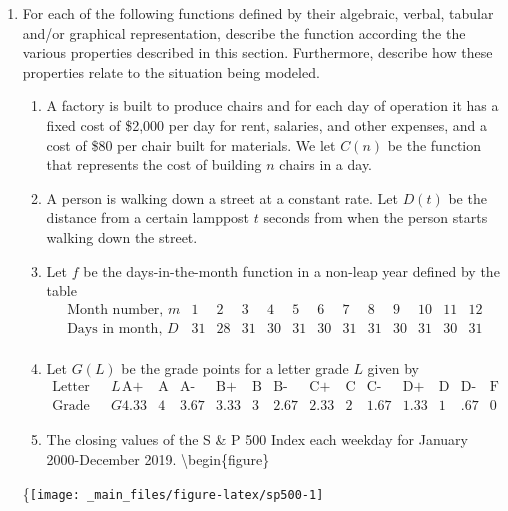 \documentclass[
]{book}
\theoremstyle{definition}
\theoremstyle{definition}
\theoremstyle{definition}
\theoremstyle{definition}
\theoremstyle{remark}
\begin{document}
\begin{enumerate}
\def\labelenumi{\arabic{enumi}.}
\item
  For each of the following functions defined by their algebraic, verbal, tabular and/or graphical representation, describe the function according the the various properties described in this section. Furthermore, describe how these properties relate to the situation being modeled.

  \begin{enumerate}
  \def\labelenumii{\alph{enumii}.}
  \item
    A factory is built to produce chairs and for each day of operation it has a fixed cost of \$2,000 per day for rent, salaries, and other expenses, and a cost of \$80 per chair built for materials. We let \(C(n)\) be the function that represents the cost of building \(n\) chairs in a day.
  \item
    A person is walking down a street at a constant rate. Let \(D(t)\) be the distance from a certain lamppost \(t\) seconds from when the person starts walking down the street.
  \item
    Let \(f\) be the days-in-the-month function in a non-leap year defined by the table
    \[\begin{array}{l|cccccccccccc}
         \mbox{Month number, } m & 1 & 2 & 3 & 4 & 5 & 6 & 7 & 8 & 9 & 10 & 11 & 12 \\ \hline
         \mbox{Days in month, } D & 31 & 28 & 31 & 30 & 31 & 30 & 31 & 31 & 30 & 31 & 30 & 31 \\
         \end{array}\]
  \item
    Let \(G(L)\) be the grade points for a letter grade \(L\) given by
    \[\begin{array}{l|ccccccccccccc}
         \mbox{Letter grade, } L & \mbox{A+} & \mbox{A} & \mbox{A-} & \mbox{B+} & \mbox{B} & \mbox{B-} & \mbox{C+} & \mbox{C} & \mbox{C-} & \mbox{D+} & \mbox{D} & \mbox{D-} & \mbox{F} \\ \hline
         \mbox{Grade Points, } G & 4.33 & 4 & 3.67 & 3.33 & 3 & 2.67 & 2.33 & 2 & 1.67 & 1.33 & 1 & .67 & 0 
         \end{array}\]
  \item
    The closing values of the S \& P 500 Index each weekday for January 2000-December 2019.
    \textbackslash begin\{figure\}
  \end{enumerate}

  \{\centering \texttt{[image: \_main\_files/figure-latex/sp500-1]}


\end{enumerate}
\end{document}
